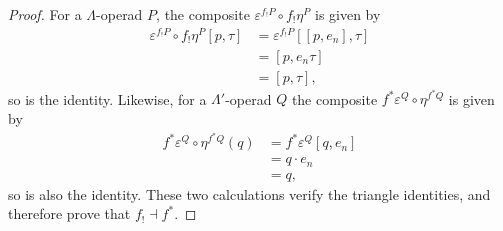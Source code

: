 \begin{proof}
For a $\Lambda$-operad $P$, the composite $\varepsilon^{f_{!}P} \circ f_{!}\eta^{P}$ is given by
\begin{align*}
\varepsilon^{f_{!}P} \circ f_{!}\eta^{P}[p, \tau] & = \varepsilon^{f_{!}P}\left[ [p,e_n], \tau\right] \\
& = [p, e_n \tau]\\
& = [p, \tau],
\end{align*}
so is the identity. Likewise, for a $\Lambda'$-operad $Q$ the composite $f^*\varepsilon^Q \circ \eta^{f^*Q}$ is given by
\begin{align*}
f^*\varepsilon^Q \circ \eta^{f^*Q}(q) & = f^*\varepsilon^Q[q,e_n] \\
& = q \cdot e_n \\
& = q,
\end{align*}
so is also the identity. These two calculations verify the triangle identities, and therefore prove that $f_{!} \dashv f^*$.
%
%
%
%
\end{proof}

